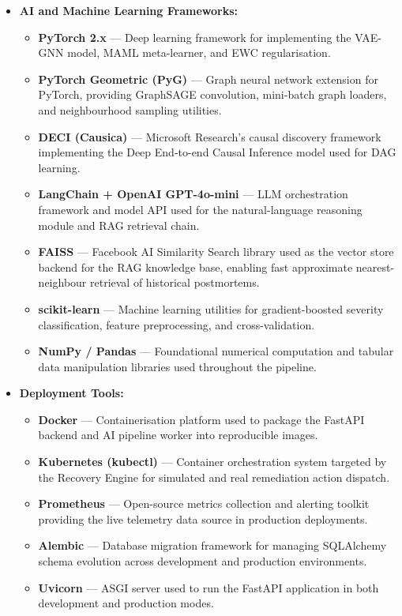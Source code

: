 \begin{itemize}
    \item \textbf{AI and Machine Learning Frameworks:}
    \begin{itemize}
        \item \textbf{PyTorch 2.x} — Deep learning framework for implementing the VAE-GNN model, MAML meta-learner, and EWC regularisation.
        \item \textbf{PyTorch Geometric (PyG)} — Graph neural network extension for PyTorch, providing GraphSAGE convolution, mini-batch graph loaders, and neighbourhood sampling utilities.
        \item \textbf{DECI (Causica)} — Microsoft Research's causal discovery framework implementing the Deep End-to-end Causal Inference model used for DAG learning.
        \item \textbf{LangChain + OpenAI GPT-4o-mini} — LLM orchestration framework and model API used for the natural-language reasoning module and RAG retrieval chain.
        \item \textbf{FAISS} — Facebook AI Similarity Search library used as the vector store backend for the RAG knowledge base, enabling fast approximate nearest-neighbour retrieval of historical postmortems.
        \item \textbf{scikit-learn} — Machine learning utilities for gradient-boosted severity classification, feature preprocessing, and cross-validation.
        \item \textbf{NumPy / Pandas} — Foundational numerical computation and tabular data manipulation libraries used throughout the pipeline.
    \end{itemize}

    \item \textbf{Deployment Tools:}
    \begin{itemize}
        \item \textbf{Docker} — Containerisation platform used to package the FastAPI backend and AI pipeline worker into reproducible images.
        \item \textbf{Kubernetes (kubectl)} — Container orchestration system targeted by the Recovery Engine for simulated and real remediation action dispatch.
        \item \textbf{Prometheus} — Open-source metrics collection and alerting toolkit providing the live telemetry data source in production deployments.
        \item \textbf{Alembic} — Database migration framework for managing SQLAlchemy schema evolution across development and production environments.
        \item \textbf{Uvicorn} — ASGI server used to run the FastAPI application in both development and production modes.
    \end{itemize}


\end{itemize}
